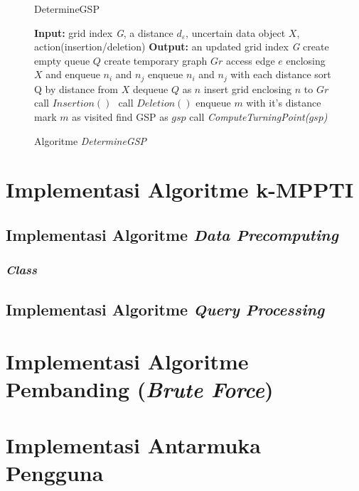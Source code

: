 \begin{figure}[H]
	\begin{algorithm}[H]
		\label{algo:gsp}
		\caption{DetermineGSP}
		\begin{algorithmic}[1]
			\State \textbf{Input: }grid index \textit{G}, a distance $ d_\varepsilon $, uncertain data object $ X $, action(insertion/deletion)
			\State \textbf{Output: }an updated grid index \textit{G}
			\State create empty queue $ Q $
			\State create temporary graph $ Gr $
			\State access edge $ e $ enclosing $ X $ and enqueue $ n_i  $ and $ n_j $
			\State enqueue $ n_i $ and $ n_j $ with each distance
			\State sort Q by distance from $ X $
			\State dequeue $ Q $ as $ n $
			\State insert grid enclosing $ n $ to $ Gr $
			call $ Insertion() $
			\Else
			$ $ call $ Deletion() $
			\EndIf
			\State enqueue $ m $ with it's distance
			\State mark $ m $ as visited
			\EndIf
			\EndFor
			\EndIf
			\EndWhile
			\State find GSP as $ gsp $
			\State call \textit{ComputeTurningPoint($ gsp $)}
			\EndFor
		\end{algorithmic}
	\end{algorithm}
	\caption{Algoritme \textit{DetermineGSP}}
\end{figure}


\section{Implementasi Algoritme k-MPPTI}
\subsection{Implementasi Algoritme \textit{Data Precomputing}}
\subsubsection{\textit{Class}}
\subsection{Implementasi Algoritme \textit{Query Processing}}
\section{Implementasi Algoritme Pembanding (\textit{Brute Force})}
\section{Implementasi Antarmuka Pengguna}